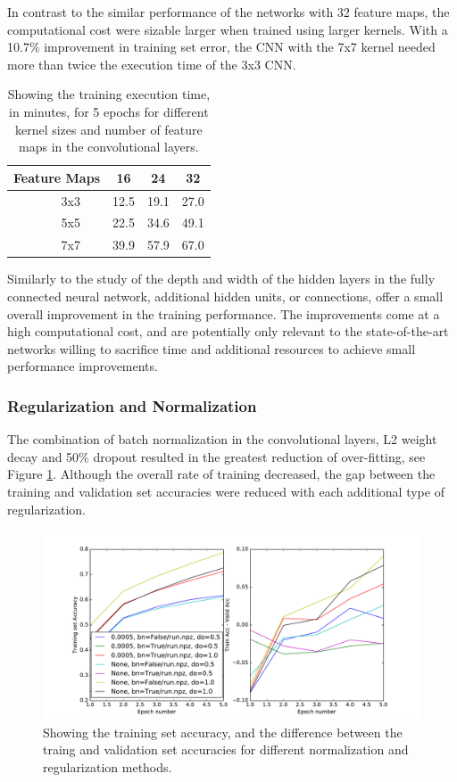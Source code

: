 \documentclass[]{article}
\newcommand*\rot{\rotatebox{90}}
\begin{document}
In contrast to the similar performance of the networks with 32 feature maps, the computational cost were sizable larger when trained using larger kernels. With a 10.7\% improvement in training set error, the CNN with the 7x7 kernel needed more than twice the execution time of the 3x3 CNN.

\begin{table}[h]
	\centering
	\caption{Showing the training execution time, in minutes, for 5 epochs for different kernel sizes and number of feature maps in the convolutional layers.}
	\label{filter-res}
	\begin{tabular}{@{}ccccc@{}}
		\toprule
		\multicolumn{2}{c}{Feature Maps} & 16 & 24 & 32 \\ \midrule
		\multirow{3}{*}{\rot{Size}} & \multicolumn{1}{c|}{3x3} & 12.5 & 19.1 & 27.0 \\
		& \multicolumn{1}{c|}{5x5} & 22.5 & 34.6 & 49.1 \\
		& \multicolumn{1}{c|}{7x7} & 39.9 & 57.9 & 67.0 \\ \bottomrule
	\end{tabular}
\end{table}

Similarly to the study of the depth and width of the hidden layers in the fully connected neural network, additional hidden units, or connections, offer a small overall improvement in the training performance. The improvements come at a high computational cost, and are potentially only relevant to the state-of-the-art networks willing to sacrifice time and additional resources to achieve small performance improvements. 

\subsubsection{Regularization and Normalization}

The combination of batch normalization in the convolutional layers, L2 weight decay and 50\% dropout resulted in the greatest reduction of over-fitting, see Figure \ref{norm_diff}. Although the overall rate of training decreased, the gap between the training and validation set accuracies were reduced with each additional type of regularization. 

\begin{figure}[h]
	\includegraphics[width=\textwidth]{norm_diff}
	\caption{Showing the training set accuracy, and the difference between the traing and validation set accuracies for different normalization and regularization methods. } 
	\label{norm_diff}
	\centering
\end{figure}
\end{document}
